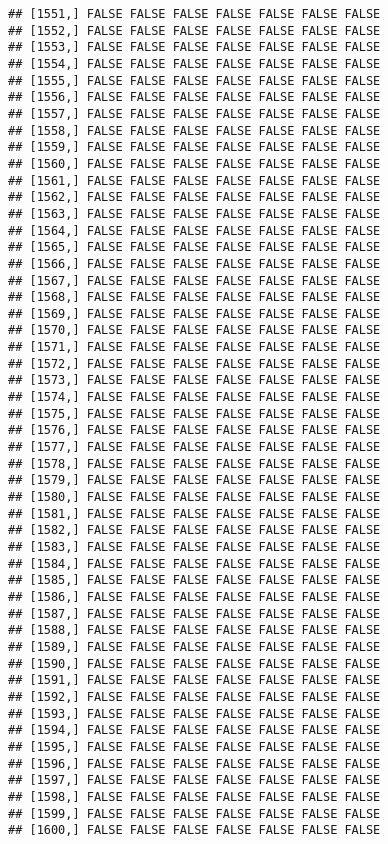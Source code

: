 \documentclass[
]{article}
\begin{document}
\begin{verbatim}
## [1551,] FALSE FALSE FALSE FALSE FALSE FALSE FALSE
## [1552,] FALSE FALSE FALSE FALSE FALSE FALSE FALSE
## [1553,] FALSE FALSE FALSE FALSE FALSE FALSE FALSE
## [1554,] FALSE FALSE FALSE FALSE FALSE FALSE FALSE
## [1555,] FALSE FALSE FALSE FALSE FALSE FALSE FALSE
## [1556,] FALSE FALSE FALSE FALSE FALSE FALSE FALSE
## [1557,] FALSE FALSE FALSE FALSE FALSE FALSE FALSE
## [1558,] FALSE FALSE FALSE FALSE FALSE FALSE FALSE
## [1559,] FALSE FALSE FALSE FALSE FALSE FALSE FALSE
## [1560,] FALSE FALSE FALSE FALSE FALSE FALSE FALSE
## [1561,] FALSE FALSE FALSE FALSE FALSE FALSE FALSE
## [1562,] FALSE FALSE FALSE FALSE FALSE FALSE FALSE
## [1563,] FALSE FALSE FALSE FALSE FALSE FALSE FALSE
## [1564,] FALSE FALSE FALSE FALSE FALSE FALSE FALSE
## [1565,] FALSE FALSE FALSE FALSE FALSE FALSE FALSE
## [1566,] FALSE FALSE FALSE FALSE FALSE FALSE FALSE
## [1567,] FALSE FALSE FALSE FALSE FALSE FALSE FALSE
## [1568,] FALSE FALSE FALSE FALSE FALSE FALSE FALSE
## [1569,] FALSE FALSE FALSE FALSE FALSE FALSE FALSE
## [1570,] FALSE FALSE FALSE FALSE FALSE FALSE FALSE
## [1571,] FALSE FALSE FALSE FALSE FALSE FALSE FALSE
## [1572,] FALSE FALSE FALSE FALSE FALSE FALSE FALSE
## [1573,] FALSE FALSE FALSE FALSE FALSE FALSE FALSE
## [1574,] FALSE FALSE FALSE FALSE FALSE FALSE FALSE
## [1575,] FALSE FALSE FALSE FALSE FALSE FALSE FALSE
## [1576,] FALSE FALSE FALSE FALSE FALSE FALSE FALSE
## [1577,] FALSE FALSE FALSE FALSE FALSE FALSE FALSE
## [1578,] FALSE FALSE FALSE FALSE FALSE FALSE FALSE
## [1579,] FALSE FALSE FALSE FALSE FALSE FALSE FALSE
## [1580,] FALSE FALSE FALSE FALSE FALSE FALSE FALSE
## [1581,] FALSE FALSE FALSE FALSE FALSE FALSE FALSE
## [1582,] FALSE FALSE FALSE FALSE FALSE FALSE FALSE
## [1583,] FALSE FALSE FALSE FALSE FALSE FALSE FALSE
## [1584,] FALSE FALSE FALSE FALSE FALSE FALSE FALSE
## [1585,] FALSE FALSE FALSE FALSE FALSE FALSE FALSE
## [1586,] FALSE FALSE FALSE FALSE FALSE FALSE FALSE
## [1587,] FALSE FALSE FALSE FALSE FALSE FALSE FALSE
## [1588,] FALSE FALSE FALSE FALSE FALSE FALSE FALSE
## [1589,] FALSE FALSE FALSE FALSE FALSE FALSE FALSE
## [1590,] FALSE FALSE FALSE FALSE FALSE FALSE FALSE
## [1591,] FALSE FALSE FALSE FALSE FALSE FALSE FALSE
## [1592,] FALSE FALSE FALSE FALSE FALSE FALSE FALSE
## [1593,] FALSE FALSE FALSE FALSE FALSE FALSE FALSE
## [1594,] FALSE FALSE FALSE FALSE FALSE FALSE FALSE
## [1595,] FALSE FALSE FALSE FALSE FALSE FALSE FALSE
## [1596,] FALSE FALSE FALSE FALSE FALSE FALSE FALSE
## [1597,] FALSE FALSE FALSE FALSE FALSE FALSE FALSE
## [1598,] FALSE FALSE FALSE FALSE FALSE FALSE FALSE
## [1599,] FALSE FALSE FALSE FALSE FALSE FALSE FALSE
## [1600,] FALSE FALSE FALSE FALSE FALSE FALSE FALSE

\end{verbatim}
\end{document}
